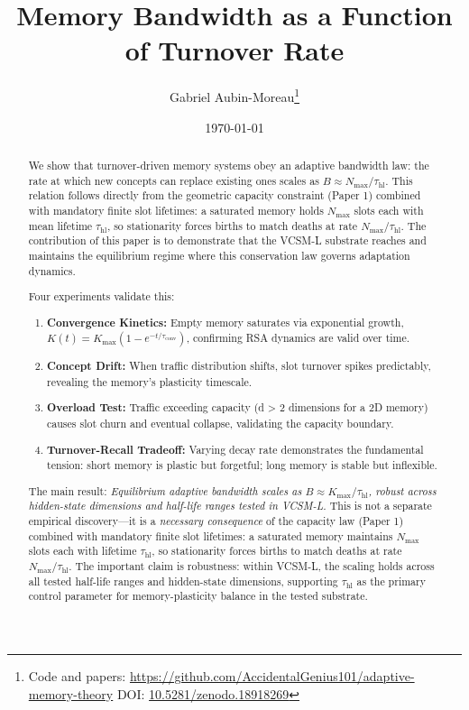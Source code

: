 \documentclass[11pt]{article}
\title{Memory Bandwidth as a Function of Turnover Rate}
\author{Gabriel Aubin-Moreau\thanks{Code and papers: \url{https://github.com/AccidentalGenius101/adaptive-memory-theory} \quad DOI: \href{https://doi.org/10.5281/zenodo.18918269}{10.5281/zenodo.18918269}}}
\date{\today}
\begin{document}
\maketitle

\begin{abstract}
We show that turnover-driven memory systems obey an adaptive bandwidth law: the rate at which new concepts can replace existing ones scales as $B \approx N_{\max}/\tau_{\text{hl}}$.
This relation follows directly from the geometric capacity constraint (Paper 1) combined with mandatory finite slot lifetimes: a saturated memory holds $N_{\max}$ slots each with mean lifetime $\tau_{\text{hl}}$, so stationarity forces births to match deaths at rate $N_{\max}/\tau_{\text{hl}}$.
The contribution of this paper is to demonstrate that the VCSM-L substrate reaches and maintains the equilibrium regime where this conservation law governs adaptation dynamics.

Four experiments validate this:
\begin{enumerate}
  \item \textbf{Convergence Kinetics:} Empty memory saturates via exponential growth, $K(t) = K_{\max}(1 - e^{-t/\tau_{\text{conv}}})$, confirming RSA dynamics are valid over time.
  \item \textbf{Concept Drift:} When traffic distribution shifts, slot turnover spikes predictably, revealing the memory's plasticity timescale.
  \item \textbf{Overload Test:} Traffic exceeding capacity (d > 2 dimensions for a 2D memory) causes slot churn and eventual collapse, validating the capacity boundary.
  \item \textbf{Turnover-Recall Tradeoff:} Varying decay rate demonstrates the fundamental tension: short memory is plastic but forgetful; long memory is stable but inflexible.
\end{enumerate}

The main result: \textit{Equilibrium adaptive bandwidth scales as $B \approx K_{\max}/\tau_{\text{hl}}$, robust across hidden-state dimensions and half-life ranges tested in VCSM-L.}
This is not a separate empirical discovery---it is a \emph{necessary consequence} of the
capacity law (Paper 1) combined with mandatory finite slot lifetimes: a saturated memory
maintains $N_{\max}$ slots each with lifetime $\tau_{\text{hl}}$, so stationarity forces
births to match deaths at rate $N_{\max}/\tau_{\text{hl}}$.
The important claim is robustness: within VCSM-L, the scaling holds across all tested
half-life ranges and hidden-state dimensions, supporting $\tau_{\text{hl}}$ as the
primary control parameter for memory-plasticity balance in the tested substrate.
\end{abstract}
\end{document}

